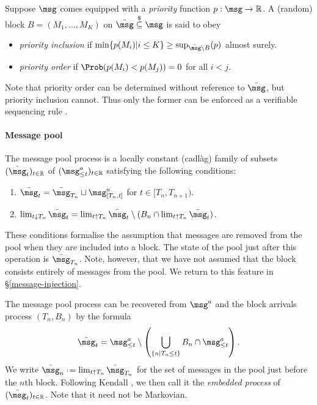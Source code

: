 \documentclass[a4paper,11pt]{article}
\begin{document}
\begin{definition}[Priority]
\label{priority-discipline}

  Suppose $\msg$ comes equipped with a \emph{priority} function $p:\msg\rightarrow\R$.
  A (random) block $B=(M_1,\ldots,M_K)$ on $\bar{\msg}\stackrel{\$}{\subseteq}\msg$ is said to obey
  \begin{itemize}
    \item \emph{priority inclusion} if $\min\{p(M_i)|i\leq K\} \geq \sup_{\bar{\msg}\setminus B}(p) $ almost surely.
    \item \emph{priority order} if $\Prob(p(M_i) < p(M_j)) = 0$ for all $i<j$.
  \end{itemize}
  Note that priority order can be determined without reference to $\bar{\msg}$, but priority inclusion cannot.
  Thus only the former can be enforced as a verifiable sequencing rule \cite{ferreira2022credible}.

\end{definition}
  
\paragraph{Message pool}
The message pool process is a locally constant (cadl\`ag) family of subsets $(\bar{\msg}_t)_{t\in \R}$ of $(\msg^a_{\leq t})_{t\in\R}$ satisfying the following conditions:
\begin{enumerate}
  \item $\bar{\msg}_t = \bar{\msg}_{T_n}\sqcup \msg^a_{[T_n,t]}$ for $t\in [T_n,T_{n+1})$. 
  \item $\lim_{t\downarrow T_n}\bar{\msg}_t = \lim_{t\uparrow T_n}\bar{\msg}_t \setminus (B_n\cap \lim_{t\uparrow T_n}\bar{\msg}_t)$.
\end{enumerate}
%
These conditions formalise the assumption that messages are removed from the pool when they are included into a block.
%
The state of the pool just after this operation is $\bar\msg_{T_n}$.
%
Note, however, that we have not assumed that the block consists entirely of messages from the pool.
%
We return to this feature in \S\ref{message-injection}.

The message pool process can be recovered from $\msg^a$ and the block arrivals process $(T_n,B_n)$ by the formula
\[
  \bar{\msg}_t = \msg^a_{\leq t} \setminus \left ( \bigcup_{\{n|T_n \leq t\}} B_n \cap \msg^a_{\leq t} \right).
\]
%
We write $\bar{\msg}_n \defeq \lim_{t\uparrow T_n}\bar{\msg}_{T_n}$ for the set of messages in the pool just before the $n$th block.
%
Following Kendall \cite{kendall1953stochastic}, we then call it the \emph{embedded process} of $(\bar\msg_t)_{t\in\R}$.
%
Note that it need not be Markovian.
\end{document}
